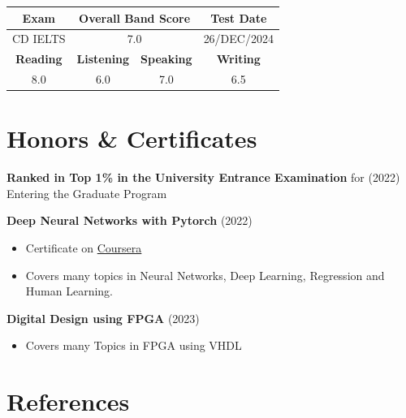 \documentclass[10pt,a4paper]{article}
\begin{document}
	\vspace{4pt}
	\begin{center}
		\renewcommand{\arraystretch}{1.2}
		\begin{tabular}{c c c c}
			\textbf{Exam} & \multicolumn{2}{c}{\textbf{Overall Band Score}} & \textbf{Test Date} \\
			\hline
			CD IELTS & \multicolumn{2}{c}{7.0} & 26/DEC/2024 \\
			\hline
			\textbf{Reading} & \textbf{Listening} & \textbf{Speaking} & \textbf{Writing} \\
			8.0 & 6.0 & 7.0 & 6.5 \\
		\end{tabular}
	\end{center}
	
	\vspace{8pt}
	\section{Honors \& Certificates}
	
	\textbf{Ranked in Top 1\% in the University Entrance Examination} for \hfill (2022) \\
	Entering the Graduate Program
	
	\vspace{8pt}
	
	\textbf{Deep Neural Networks with Pytorch} \hfill (2022)
	\begin{itemize}
		\item Certificate on \href{\#}{Coursera}
		\item Covers many topics in Neural Networks, Deep Learning, Regression and Human Learning.
	\end{itemize}
	
	\vspace{8pt}
	
	\textbf{Digital Design using FPGA} \hfill (2023)
	\begin{itemize}
		\item Covers many Topics in FPGA using VHDL
	\end{itemize}
	
	\section{References}
	
\end{document}

